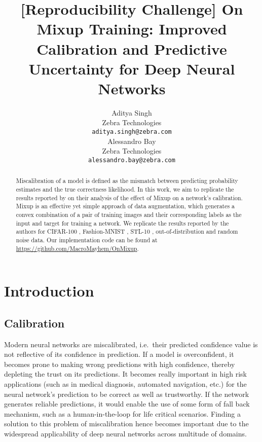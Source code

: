 \documentclass{article}
\title{[Reproducibility Challenge] On Mixup Training: Improved Calibration and
Predictive Uncertainty for Deep Neural Networks}
\author{%
  Aditya Singh \\
  Zebra Technologies \\
  \texttt{aditya.singh@zebra.com} \\
  \And
  Alessandro Bay \\
  Zebra Technologies \\
  \texttt{alessandro.bay@zebra.com} \\
}
\begin{document}
\maketitle

\begin{abstract}
  Miscalibration of a model is defined as the mismatch between predicting probability estimates and the true correctness likelihood. In this work, we aim to replicate the results reported by \cite{onmixup} on their analysis of the effect of Mixup \cite{mixup_2018} on a network's calibration. Mixup is an effective yet simple approach of data augmentation, which generates a convex combination of a pair of training images and their corresponding labels as the input and target for training a network. We replicate the results reported by the authors for CIFAR-100 \cite{cifar100}, Fashion-MNIST \cite{fmnist}, STL-10 \cite{stl10}, out-of-distribution and random noise data. Our implementation code can be found at \url{https://github.com/MacroMayhem/OnMixup}.
\end{abstract}


\section{Introduction}
\subsection{Calibration}
Modern neural networks are miscalibrated, i.e.\ their predicted confidence value is not reflective of its confidence in prediction. If a model is overconfident, it becomes prone to making wrong predictions with high confidence, thereby depleting the trust on its predictions. It becomes really important in high risk applications (such as in medical diagnosis, automated navigation, etc.) for the neural network's prediction to be correct as well as trustworthy. If the network generates reliable predictions, it would enable the use of some form of fall back mechanism, such as a human-in-the-loop for life critical scenarios. Finding a solution to this problem of miscalibration hence becomes important due to the widespread applicability of deep neural networks %
across multitude of domains.
\end{document}
